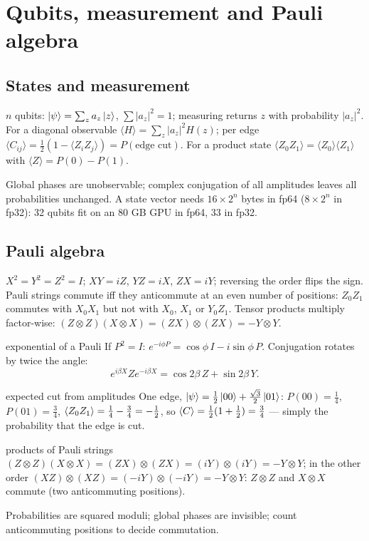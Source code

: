 \documentclass[11pt,a4paper,openany]{book}
\newcounter{wex}[chapter]
\begin{document}
\section{Qubits, measurement and Pauli algebra}
\subsection{States and measurement}
$n$ qubits: $\ket\psi = \sum_z a_z\ket z$, $\sum|a_z|^2 = 1$; measuring returns $z$ with probability $|a_z|^2$. For a diagonal observable
$\langle H\rangle = \sum_z|a_z|^2H(z)$; per edge $\langle C_{ij}\rangle = \frac12(1 - \langle Z_iZ_j\rangle) = P(\text{edge cut})$. For a product
state $\langle Z_0Z_1\rangle = \langle Z_0\rangle\langle Z_1\rangle$ with $\langle Z\rangle = P(0) - P(1)$.

Global phases are unobservable; complex conjugation of all amplitudes leaves all probabilities unchanged. A state vector needs
$16\times2^n$ bytes in fp64 ($8\times2^n$ in fp32): 32 qubits fit on an 80 GB GPU in fp64, 33 in fp32.

\subsection{Pauli algebra}
$X^2 = Y^2 = Z^2 = I$; $XY = iZ$, $YZ = iX$, $ZX = iY$; reversing the order flips the sign. Pauli strings commute iff they
anticommute at an even number of positions: $Z_0Z_1$ commutes with $X_0X_1$ but not with $X_0$, $X_1$ or $Y_0Z_1$. Tensor products
multiply factor-wise: $(Z\otimes Z)(X\otimes X) = (ZX)\otimes(ZX) = -Y\otimes Y$.

\begin{keyres}{exponential of a Pauli}
If $P^2 = I$: $e^{-i\phi P} = \cos\phi\,I - i\sin\phi\,P$. Conjugation rotates by twice the angle:
\[ e^{i\beta X}Ze^{-i\beta X} = \cos2\beta\,Z + \sin2\beta\,Y . \]
\end{keyres}

\begin{wexample}{expected cut from amplitudes}
One edge, $\ket\psi = \tfrac12\ket{00} + \tfrac{\sqrt3}{2}\ket{01}$: $P(00) = \frac14$, $P(01) = \frac34$, $\braket{Z_0Z_1} = \frac14 - \frac34 = -\frac12$, so
$\braket C = \frac12(1 + \frac12) = \frac34$ --- simply the probability that the edge is cut.
\end{wexample}
\begin{wexample}{products of Pauli strings}
$(Z\otimes Z)(X\otimes X) = (ZX)\otimes(ZX) = (iY)\otimes(iY) = -Y\otimes Y$; in the other order $(XZ)\otimes(XZ) = (-iY)\otimes(-iY) = -Y\otimes Y$:
$Z\otimes Z$ and $X\otimes X$ commute (two anticommuting positions).
\end{wexample}
\begin{checklist}
Probabilities are squared moduli; global phases are invisible; count anticommuting positions to decide commutation.
\end{checklist}
\end{document}
